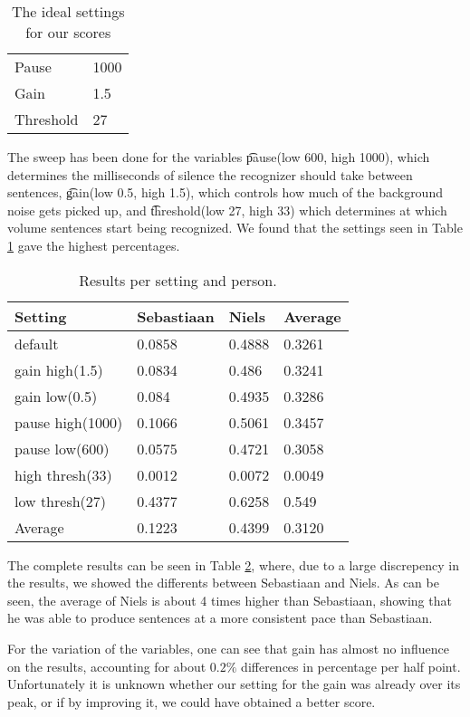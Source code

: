 
\begin{table}[]
\centering
\begin{tabular}{l|l}
Pause     & 1000 \\
Gain      & 1.5    \\
Threshold & 27  
\end{tabular}
\caption{The ideal settings for our scores}
\label{best_settings}
\end{table}

The sweep has been done for the variables \t{pause}(low 600, high 1000), which determines the milliseconds of silence the recognizer should take between sentences, \t{gain}(low 0.5, high 1.5), which controls how much of the background noise gets picked up, and \t{threshold}(low 27, high 33) which determines at which volume sentences start being recognized. We found that the settings seen in Table \ref{best_settings} gave the highest percentages.

\begin{table}[h!]
\centering
\begin{tabular}{l|lll}
Setting          & Sebastiaan & Niels  & Average \\ \hline
default          & 0.0858     & 0.4888 & 0.3261  \\ 
gain high(1.5)   & 0.0834     & 0.486  & 0.3241  \\ 
gain low(0.5)    & 0.084      & 0.4935 & 0.3286  \\ 
pause high(1000) & 0.1066     & 0.5061 & 0.3457  \\ 
pause low(600)   & 0.0575     & 0.4721 & 0.3058  \\ 
high thresh(33)  & 0.0012     & 0.0072 & 0.0049  \\ 
low thresh(27)   & 0.4377     & 0.6258 & 0.549   \\ \hline
Average          & 0.1223     & 0.4399 & 0.3120  \\ 
\end{tabular}
\caption{Results per setting and person.}
\label{results}
\end{table}

The complete results can be seen in Table \ref{results}, where, due to a large discrepency in the results, we showed the differents between Sebastiaan and Niels. As can be seen, the average of Niels is about 4 times higher than Sebastiaan, showing that he was able to produce sentences at a more consistent pace than Sebastiaan.

For the variation of the variables, one can see that gain has almost no influence on the results, accounting for about $0.2\%$ differences in percentage per half point. Unfortunately it is unknown whether our setting for the gain was already over its peak, or if by improving it, we could have obtained a better score.

